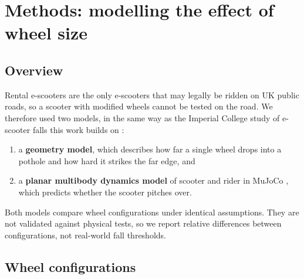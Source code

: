 
\section{Methods: modelling the effect of wheel size}\label{methods-modelling-the-effect-of-wheel-size}

\subsection{Overview}\label{overview}

Rental e-scooters are the only e-scooters that may legally be ridden on UK public roads,
so a scooter with modified wheels cannot be tested on the road. We therefore used two
models, in the same way as the Imperial College study of e-scooter falls this work builds
on \autocite{posirisuk2022}:

\begin{enumerate}
\def\labelenumi{\arabic{enumi}.}
\tightlist
\item
  a \textbf{geometry model}, which describes how far a single wheel drops into a pothole and
  how hard it strikes the far edge, and
\item
  a \textbf{planar multibody dynamics model} of scooter and rider in MuJoCo
  \autocite{todorov2012mujoco}, which predicts whether the scooter pitches over.
\end{enumerate}

Both models compare wheel configurations under identical assumptions. They are not
validated against physical tests, so we report relative differences between
configurations, not real-world fall thresholds.

\subsection{Wheel configurations}\label{wheel-configurations}


